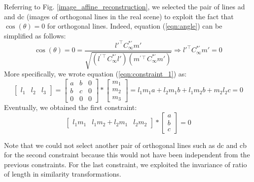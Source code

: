 \documentclass[11pt, oneside]{article}
\begin{document}
Referring to Fig. \ref{image_affine_reconstruction}, we selected the pair of lines ad and dc (images of orthogonal lines in the real scene) to exploit the fact that $\cos(\theta) = 0$ for orthogonal lines. Indeed, equation (\ref{eqn:angle}) can be simplified as follows:
\begin{equation}
	\label{eqn:constraint_1}
	\cos(\theta) = 0 =
	\frac{l{'^\intercal} C^{*'}_\infty m'}{\sqrt{(l^{'\intercal} C^{*'}_\infty l')(m^{'\intercal} C^{*'}_\infty m')}} 
	\Rightarrow
	l{'^\intercal} C^{*'}_\infty m' = 0
\end{equation}
More specifically, we wrote equation (\ref{eqn:constraint_1}) as:
\begin{equation}
	\begin{bmatrix}
		l_1 & l_2 & l_3
	\end{bmatrix}
	=
	\begin{bmatrix}
		a & b & 0 \\ b & c & 0 \\ 0 & 0 & 0
	\end{bmatrix} *
	\begin{bmatrix}
		m_1 \\ m_2 \\ m_3
	\end{bmatrix}
	= l_1 m_1 a + l_2 m_1 b + l_1 m_2 b + m_2 l_2 c = 0
\end{equation}
Eventually, we obtained the first constraint:
\begin{equation}
	\begin{bmatrix}
		l_1 m_1 & l_1 m_2 + l_2 m_1 & l_2 m_2
	\end{bmatrix}
	*
	\begin{bmatrix}
		a \\ b \\ c
	\end{bmatrix}
	= 0
\end{equation}

Note that we could not select another pair of orthogonal lines such as dc and cb for the second constraint because this would not have been independent from the previous constraints. For the last constraint, we exploited the invariance of ratio of length in similarity transformations.
\end{document}
